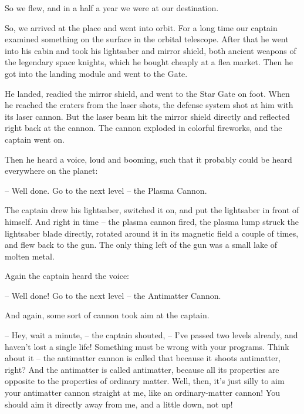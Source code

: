 \documentclass[ebook,twoside,final,openright]{memoir}
\begin{document}
So we flew, and in a half a year we were at our destination.\par
\par
So, we arrived at the place and went into orbit. For a long time our captain examined something on the surface in the orbital telescope. After that he went into his cabin and took his lightsaber and mirror shield, both ancient weapons of the legendary space knights, which he bought cheaply at a flea market. Then he got into the landing module and went to the Gate.\par
\par
He landed, readied the mirror shield, and went to the Star Gate on foot. When he reached the craters from the laser shots, the defense system shot at him with its laser cannon. But the laser beam hit the mirror shield directly and reflected right back at the cannon. The cannon exploded in colorful fireworks, and the captain went on.\par
\par
Then he heard a voice, loud and booming, such that it probably could be heard everywhere on the planet:\par
– Well done. Go to the next level – the Plasma Cannon.\par
The captain drew his lightsaber, switched it on, and put the lightsaber in front of himself. And right in time – the plasma cannon fired, the plasma lump struck the lightsaber blade directly, rotated around it in its magnetic field a couple of times, and flew back to the gun. The only thing left of the gun was a small lake of molten metal.\par
\par
Again the captain heard the voice:\par
– Well done! Go to the next level – the Antimatter Cannon.\par
And again, some sort of cannon took aim at the captain.\par
– Hey, wait a minute, – the captain shouted, – I’ve passed two levels already, and haven’t lost a single life! Something must be wrong with your programs. Think about it – the antimatter cannon is called that because it shoots antimatter, right? And the antimatter is called antimatter, because all its properties are opposite to the properties of ordinary matter. Well, then, it’s just silly to aim your antimatter cannon straight at me, like an ordinary-matter cannon! You should aim it directly away from me, and a little down, not up!\par
\par
\end{document}
